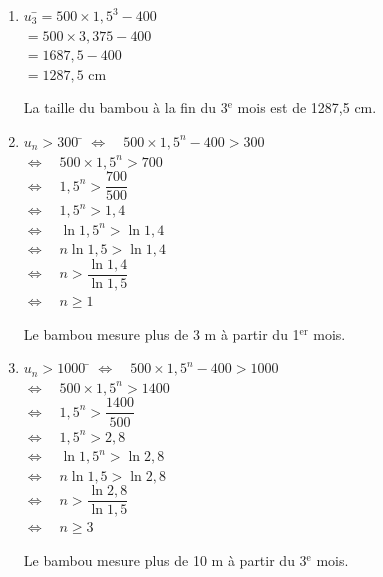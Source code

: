 \documentclass[a4paper,11pt,exos]{nsi} %
\begin{document}
\textcolor{UGLiBlue}{
    \begin{enumerate}
        \item \begin{tabbing}
            $u_3$\=$=500\times 1,5^3-400$\\
            \> $=500\times 3,375-400$\\
            \> $=1687,5-400$\\
            \> $=1287,5$ cm
        \end{tabbing}
        La taille du bambou à la fin du 3$^{\text{e}}$ mois est de 1287,5 cm.
        \item \begin{tabbing}
            $u_n>300$ \= $\iff \quad 500\times 1,5^n-400>300$\\
            \> $\iff \quad 500\times 1,5^n>700$\\
            \> $\iff \quad 1,5^n>\dfrac{700}{500}$\\
            \> $\iff \quad 1,5^n>1,4$\\
            \> $\iff \quad \ln 1,5^n>\ln 1,4$\\
            \> $\iff \quad n\ln 1,5>\ln 1,4$\\
            \> $\iff \quad n>\dfrac{\ln 1,4}{\ln 1,5}$\\
            \> $\iff \quad n\geqslant 1$
        \end{tabbing}
        Le bambou mesure plus de 3 m à partir du 1$^{\text{er}}$ mois.
        \item \begin{tabbing}
            $u_n>1000$ \= $\iff \quad 500\times 1,5^n-400>1000$\\
            \> $\iff \quad 500\times 1,5^n>1400$\\
            \> $\iff \quad 1,5^n>\dfrac{1400}{500}$\\
            \> $\iff \quad 1,5^n>2,8$\\
            \> $\iff \quad \ln 1,5^n>\ln 2,8$\\
            \> $\iff \quad n\ln 1,5>\ln 2,8$\\
            \> $\iff \quad n>\dfrac{\ln 2,8}{\ln 1,5}$\\
            \> $\iff \quad n\geqslant 3$
        \end{tabbing}
        Le bambou mesure plus de 10 m à partir du 3$^{\text{e}}$ mois.
    \end{enumerate}}

\end{document}
